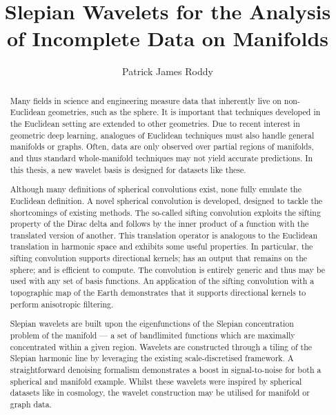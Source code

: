 
\title{Slepian Wavelets for the Analysis of Incomplete Data on Manifolds}
\author{Patrick James Roddy}

\maketitle
\makedeclaration{}

\begin{abstract} %
	Many fields in science and engineering measure data that inherently live on non-Euclidean geometries, such as the sphere.
	It is important that techniques developed in the Euclidean setting are extended to other geometries.
	Due to recent interest in geometric deep learning, analogues of Euclidean techniques must also handle general manifolds or graphs.
	Often, data are only observed over partial regions of manifolds, and thus standard whole-manifold techniques may not yield accurate predictions.
	In this thesis, a new wavelet basis is designed for datasets like these.

	Although many definitions of spherical convolutions exist, none fully emulate the Euclidean definition.
	A novel spherical convolution is developed, designed to tackle the shortcomings of existing methods.
	The so-called sifting convolution exploits the sifting property of the Dirac delta and follows by the inner product of a function with the translated version of another.
	This translation operator is analogous to the Euclidean translation in harmonic space and exhibits some useful properties.
	In particular, the sifting convolution supports directional kernels; has an output that remains on the sphere; and is efficient to compute.
	The convolution is entirely generic and thus may be used with any set of basis functions.
	An application of the sifting convolution with a topographic map of the Earth demonstrates that it supports directional kernels to perform anisotropic filtering.

	Slepian wavelets are built upon the eigenfunctions of the Slepian concentration problem of the manifold --- a set of bandlimited functions which are maximally concentrated within a given region.
	Wavelets are constructed through a tiling of the Slepian harmonic line by leveraging the existing scale-discretised framework.
	A straightforward denoising formalism demonstrates a boost in signal-to-noise for both a spherical and manifold example.
	Whilst these wavelets were inspired by spherical datasets like in cosmology, the wavelet construction may be utilised for manifold or graph data.
\end{abstract}

